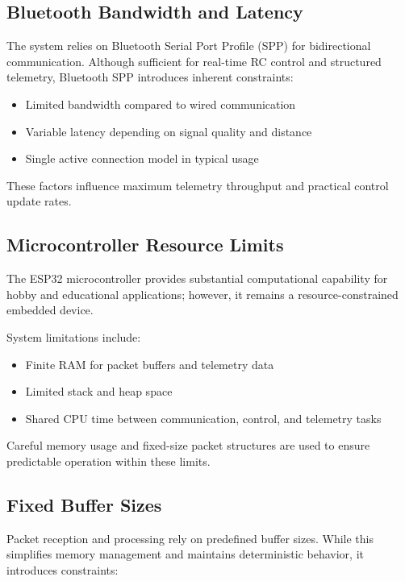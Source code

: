 \subsection{Bluetooth Bandwidth and Latency}

The system relies on Bluetooth Serial Port Profile (SPP) for bidirectional communication. Although sufficient for real-time RC control and structured telemetry, Bluetooth SPP introduces inherent constraints:

\begin{itemize}
	\item Limited bandwidth compared to wired communication
	\item Variable latency depending on signal quality and distance
	\item Single active connection model in typical usage
\end{itemize}

These factors influence maximum telemetry throughput and practical control update rates.

\subsection{Microcontroller Resource Limits}

The ESP32 microcontroller provides substantial computational capability for hobby and educational applications; however, it remains a resource-constrained embedded device.

System limitations include:

\begin{itemize}
	\item Finite RAM for packet buffers and telemetry data
	\item Limited stack and heap space
	\item Shared CPU time between communication, control, and telemetry tasks
\end{itemize}

Careful memory usage and fixed-size packet structures are used to ensure predictable operation within these limits.

\subsection{Fixed Buffer Sizes}

Packet reception and processing rely on predefined buffer sizes. While this simplifies memory management and maintains deterministic behavior, it introduces constraints:

